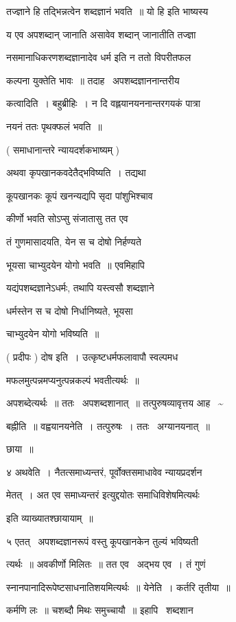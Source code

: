 \documentclass[11pt, openany]{book}
\begin{document}
तज्ज्ञाने हि तद्भिन्नत्वेन शब्दज्ञानं भवति~॥ {\qt यो हि} इति भाष्यस्य 

य एव अपशब्दान् जानाति असावेव शब्दान् जानातीति तज्ज्ञा \textendash\ 

नसमानाधिकरणशब्दज्ञानादेव धर्म इति न ततो विपरीतफल \textendash\ 

कल्पना युक्तेति भावः~॥ तदाह \textendash\ अपशब्दज्ञाननान्तरीय \textendash\ 

कत्वादिति~। बहुब्रीहिः~। न दि वह्लयानयननान्तरगयकं पात्रा \textendash\ 

नयनं ततः पृथक्फलं भवति~॥ 

( समाधानान्तरे न्यायदर्शकभाष्यम् ) 

अथवा कृपखानकवदेतैद्भविष्यति~। तद्यथा \textendash\ 

कूपखानकः कूपं खनन्यद्यपि सृदा पांशुभिश्चाव \textendash\ 

कीर्णो भवति सोऽप्सु संजातासु तत एव 

तं गुणमासादयति, येन स च दोषो निर्हण्यते 

भूयसा चाभ्युदयेन योगो भवति~॥ एवमिहापि 

यद्यंपशब्दज्ञानेऽधर्मः, तथापि यस्त्वसौ शब्दज्ञाने 

धर्मस्तेन स च दोषो निर्धानिष्यते, भूयसा 

चाभ्युदयेन योगो भविष्यति~॥ 

( प्रदीपः ) दोष इति~। उत्कृष्टधर्मफलावापौ स्वल्पमध \textendash\ 

मफलमुत्पन्नमप्यनुत्पन्नकल्पं भवतीत्यर्थः~॥ 

अपशब्देत्यर्थः~॥ ततः \textendash\ अपशब्दशानात्~॥ तत्पुरुषव्यावृत्तय
आह \textendash\ \textasciitilde 

बह्नीति~॥ वह्वयानयनेति~। तत्पुरुषः~। ततः \textendash\ अग्यानयनात्~॥ 

छाया~॥ 

४ अथवेति~। नैतत्समाध्यन्तरं, पूर्वोक्तसमाधावेव न्यायप्रदर्शन \textendash\ 

मेतत्~। अत एव {\qt समाध्यन्तरं} इत्युद्दयोतः {\qt समाधिविशेषमित्यर्थः} 

इति व्याख्यातश्छायायाम्~॥ 

५ एतत् \textendash\ अपशब्दज्ञानरूपं वस्तु कूपखानकेन तुल्यं भविष्यती \textendash\ 

त्यर्थः~॥ अवकीर्णो मिलितः~॥ तत एव \textendash\ अद्भय एव~। तं गुणं \textendash\ 

स्नानपानादिरूपेष्टसाधनातिशयमित्यर्थः~॥ येनेति~। कर्तरि तृतीया~॥ 

कर्मणि लः~॥ चशब्दौ मिथः समुच्चायौ~॥ इहापि \textendash\ शब्दशान \textendash\ 
\end{document}
